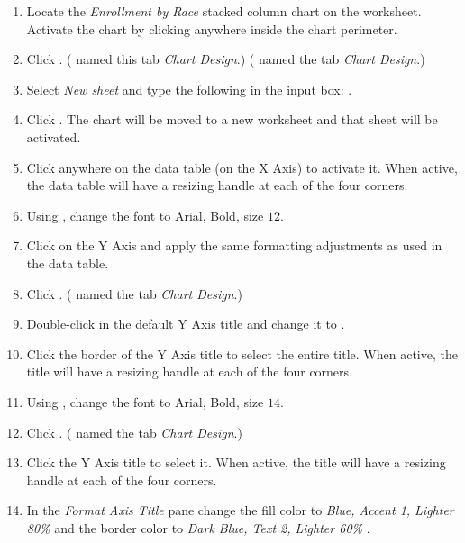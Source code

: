 \begin{enumerate}
	\item Locate the \textit{Enrollment by Race} stacked column chart on the  worksheet. Activate the chart by clicking anywhere inside the chart perimeter.
	\item Click . ( named this tab \textit{Chart Design}.) ( named the tab \textit{Chart Design}.)
	\item Select \textit{New sheet} and type the following in the input box: . 
	\item Click . The chart will be moved to a new worksheet and that sheet will be activated.
	\item Click anywhere on the data table (on the X Axis) to activate it. When active, the data table will have a resizing handle at each of the four corners.
	\item Using , change the font to Arial, Bold, size $ 12 $.
	\item Click on the Y Axis and apply the same formatting adjustments as used in the data table. 
	\item Click . ( named the tab \textit{Chart Design}.)
	\item Double-click in the default Y Axis title and change it to .
	\item Click the border of the Y Axis title to select the entire title. When active, the title will have a resizing handle at each of the four corners.
	\item Using , change the font to Arial, Bold, size $ 14 $.
	\item Click . ( named the tab \textit{Chart Design}.)
	\item Click the Y Axis title to select it. When active, the title will have a resizing handle at each of the four corners.
	\item In the \textit{Format Axis Title} pane change the fill color to \textit{Blue, Accent 1, Lighter 80\%} and the border color to \textit{Dark Blue, Text 2, Lighter 60\%} .

\end{enumerate}
